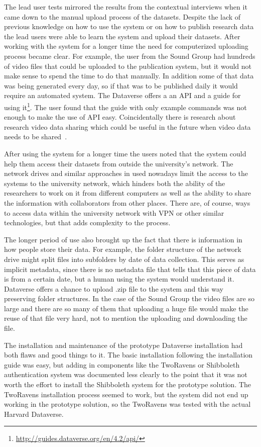 The lead user tests mirrored the results from the contextual interviews when
it came down to the manual upload process of the datasets. Despite the lack of
previous knowledge on how to use the system or on how to publish research data
the lead users were able to learn the system and upload their datasets. After
working with the system for a longer time the need for computerized uploading
process became clear. For example, the user from the Sound Group had hundreds
of video files that could be uploaded to the publication system, but it would
not make sense to spend the time to do that manually. In addition some of that
data was being generated every day, so if that was to be published daily it
would require an automated system. The Dataverse offers a an API and a guide
for using it\footnote{\url{http://guides.dataverse.org/en/4.2/api/}}. The
user found that the guide with only example commands was
not enough to make the use of API easy. Coincidentally there is research
about research video data sharing which could be useful in the future when
video data needs to be shared~\cite{DBLP:conf/jcdl/SimonGSG15}.

After using the system for a longer time the users noted that the system could
help them access their datasets from outside the university's network. The
network drives and similar approaches in used nowadays limit the access to
the systems to the university network, which hinders both the ability of the
researchers to work on it from different computers as well as the ability to
share the information with collaborators from other places. There are, of
course, ways to access data within the university network with VPN or other
similar technologies, but that adds complexity to the process.

The longer period of use also brought up the fact that there is information in
how people store their data. For example, the folder structure of the network
drive might split files into subfolders by date of data collection. This serves
as implicit metadata, since there is no metadata file that tells that this
piece of data is from a certain date, but a human using the system would
understand it. Dataverse offers a chance to upload .zip file to the system
and this way preserving folder structures. In the case of
the Sound Group the video files are so large and there are so many of them
that uploading a huge file would make the reuse of that file very hard, not
to mention the uploading and downloading the file.

The installation and maintenance of the prototype Dataverse installation had
both flaws and good things to it. The basic installation following the
installation guide was easy, but adding in components like the TwoRavens or
Shibboleth authentication system was documented less clearly to the point that
it was not worth the effort to install the Shibboleth system for the prototype
solution. The TwoRavens installation process seemed to work, but the system
did not end up working in the prototype solution, so the TwoRavens was tested
with the actual Harvard Dataverse.

